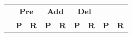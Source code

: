 \documentclass[3p,times]{elsarticle}
\begin{document}

\begin{table}[hbt!]
	\begin{center}
		\begin{scriptsize}
			\begin{tabular}{l|l|l|l|l|l|l||l|l|}
				& \multicolumn{2}{|c|}{\bf Pre} & \multicolumn{2}{|c|}{\bf Add} & \multicolumn{2}{|c||}{\bf Del} & \multicolumn{2}{|c}{\bf}\\ \cline{2-9}			
				& \multicolumn{1}{|c|}{\bf P} & \multicolumn{1}{|c|}{\bf R} & \multicolumn{1}{|c|}{\bf P} & \multicolumn{1}{|c|}{\bf R} & \multicolumn{1}{|c|}{\bf P} & \multicolumn{1}{|c||}{\bf R} &  \multicolumn{1}{|c|}{\bf P} & \multicolumn{1}{|c|}{\bf R} \\
				\hline


\end{tabular}
\end{scriptsize}
\end{center}
\end{table}
\end{document}
